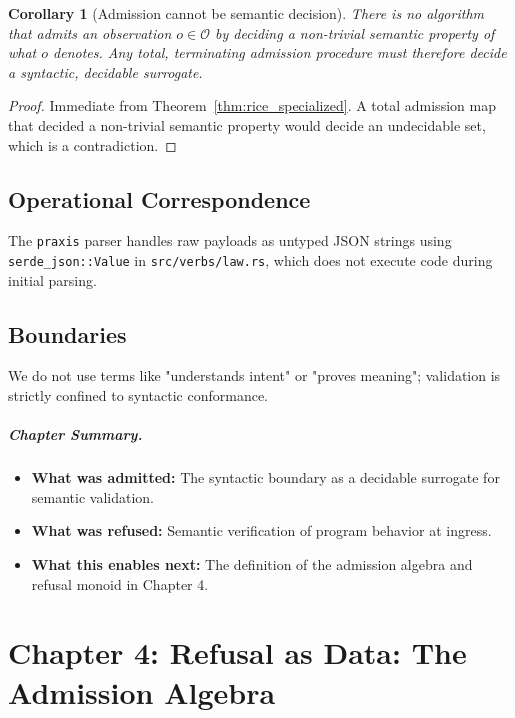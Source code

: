 \documentclass[11pt,oneside]{book}
\theoremstyle{definition}
\theoremstyle{plain}
\newtheorem{corollary}[theorem]{Corollary}
\theoremstyle{remark}
\newcommand{\Obs}{\mathcal{O}}                 %
\newcommand{\code}[1]{\texttt{#1}}
\begin{document}
\begin{corollary}[Admission cannot be semantic decision]\label{cor:no_semantic_admit}
There is no algorithm that admits an observation $o\in\Obs$ by deciding a non-trivial semantic property of what $o$ denotes. %
Any total, terminating admission procedure must therefore decide a syntactic, decidable surrogate. %
\end{corollary}

\begin{proof}
Immediate from Theorem~\ref{thm:rice_specialized}. %
A total admission map that decided a non-trivial semantic property would decide an undecidable set, which is a contradiction. %
\end{proof}

\section{Operational Correspondence}
The \code{praxis} parser handles raw payloads as untyped JSON strings using \code{serde\_json::Value} in \code{src/verbs/law.rs}, which does not execute code during initial parsing. %

\section{Boundaries}
We do not use terms like "understands intent" or "proves meaning"; validation is strictly confined to syntactic conformance. %

\paragraph{Chapter Summary.}
\begin{itemize}
  \item \textbf{What was admitted:} The syntactic boundary as a decidable surrogate for semantic validation. %
  \item \textbf{What was refused:} Semantic verification of program behavior at ingress. %
  \item \textbf{What this enables next:} The definition of the admission algebra and refusal monoid in Chapter 4. %
\end{itemize}

\chapter{Chapter 4: Refusal as Data: The Admission Algebra}
\label{ch:refusal_algebra}
\end{document}
